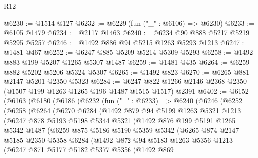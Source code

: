 \begin{lexlean}{R12}
\begin{coremodule}
@6230 := @1514 @127
@6232 := @6229 (fun ("_" : @6106) => @6230)
@6233 := @6105 @1479
@6234 := @2117 @1463
@6240 := @6234 @90 @888 @5217 @5219 @5295 @5257
@6246 := @1492 @886 @94 @5215 @1263 @5293 @1213
@6247 := @1481 @467
@6252 := @6247 @885 @5209 @5214 @5309 @5293
@6258 := @1492 @883 @199 @5207 @1265 @5307 @1487
@6259 := @1481 @435
@6264 := @6259 @882 @5202 @5206 @5324 @5307
@6265 := @1492 @823
@6270 := @6265 @881 @2147 @5201 @2350 @5323
@6284 := @6247 @822 @1266 @2146 @2368 @2350 (@1507 @199 @1263 @1265 @196 @1487 @1515 @1517) @2391
@6402 := @6152
    (@6163
      (@6180
        (@6186
          (@6232
            (fun ("_" : @6233) =>
            @6240
              (@6246
                (@6252
                  (@6258
                    (@6264
                      (@6270
                        @6284
                        (@1492
                          @879
                          @94
                          @5199
                          @1263
                          @5321
                          @1213
                          (@6247
                            @878
                            @5193
                            @5198
                            @5344
                            @5321
                            (@1492
                              @876
                              @199
                              @5191
                              @1265
                              @5342
                              @1487
                              (@6259
                                @875
                                @5186
                                @5190
                                @5359
                                @5342
                                (@6265
                                  @874
                                  @2147
                                  @5185
                                  @2350
                                  @5358
                                  @6284
                                  (@1492
                                    @872
                                    @94
                                    @5183
                                    @1263
                                    @5356
                                    @1213
                                    (@6247
                                      @871
                                      @5177
                                      @5182
                                      @5377
                                      @5356
                                      (@1492
                                        @869

\end{coremodule}
\end{lexlean}
